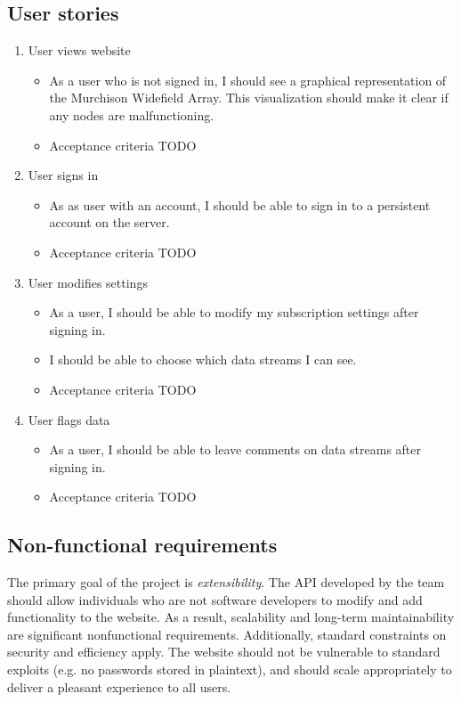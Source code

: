 \documentclass[12pt]{article}
\begin{document}
\begin{spacing}{1.5}
\subsection{User stories}
\begin{enumerate}
\item User views website
	\begin{itemize}
		\item As a user who is not signed in, I should see a graphical representation of the Murchison Widefield Array. This visualization should make it clear if any nodes are malfunctioning.
		\item Acceptance criteria TODO
	\end{itemize}
\item User signs in
	\begin{itemize}
        		\item As as user with an account, I should be able to sign in to a persistent account on the server.
        		\item Acceptance criteria TODO
	\end{itemize}
\item User modifies settings
	\begin{itemize}
		\item As a user, I should be able to modify my subscription settings after signing in.
		\item I should be able to choose which data streams I can see.
		\item Acceptance criteria TODO
	\end{itemize}
\item User flags data
	\begin{itemize}
		\item As a user, I should be able to leave comments on data streams after signing in.
		\item Acceptance criteria TODO
	\end{itemize}
\end{enumerate}

\subsection{Non-functional requirements}
The primary goal of the project is \emph{extensibility}. The API developed by the team should allow individuals who are not software developers to modify and add functionality to the website. As a result, scalability and long-term maintainability are significant nonfunctional requirements. Additionally, standard constraints on security and efficiency apply. The website should not be vulnerable to standard exploits (e.g. no passwords stored in plaintext), and should scale appropriately to deliver a pleasant experience to all users.


\end{spacing}
\end{document}
